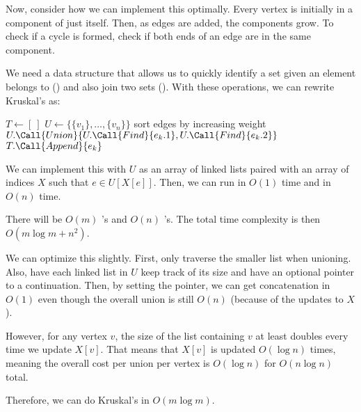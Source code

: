 Now, consider how we can implement this optimally.
Every vertex is initially in a component of just itself.
Then, as edges are added, the components grow.
To check if a cycle is formed, check if both ends of an edge are in the same component.

We need a data structure that allows us to quickly identify
a set given an element belongs to () and also join two sets ().
With these operations, we can rewrite Kruskal's as:

\begin{algorithm}[H]
  \caption{}
  \begin{algorithmic}[1]
    \State $T \gets [\ ]$
    \State $U \gets \{\{v_1\},\dotsc,\{v_n\}\}$
    \State sort edges by increasing weight
    \State $U.\Call{Union}{U.\Call{Find}{e_k.1}, U.\Call{Find}{e_k.2}}$
    \State $T.\Call{Append}{e_k}$
    \EndIf
    \EndFor
  \end{algorithmic}
\end{algorithm}

We can implement this with $U$ as an array of linked lists
paired with an array of indices $X$ such that $e \in U[X[e]]$.
Then, we can run  in $O(1)$ time and  in $O(n)$ time.

There will be $O(m)$ 's and $O(n)$ 's.
The total time complexity is then $O(m \log m + n^2)$.

We can optimize this slightly.
First, only traverse the smaller list when unioning. 
Also, have each linked list in $U$ keep track of its size
and have an optional pointer to a continuation.
Then, by setting the pointer, we can get concatenation in $O(1)$
even though the overall union is still $O(n)$ (because of the updates to $X$).

However, for any vertex $v$, the size of the list containing $v$
at least doubles every time we update $X[v]$.
That means that $X[v]$ is updated $O(\log n)$ times,
meaning the overall cost per union per vertex is $O(\log n)$ for $O(n \log n)$ total.

Therefore, we can do Kruskal's in $O(m\log m)$.
